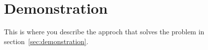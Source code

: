 \section{Demonstration}

This is where you describe the approch that solves the problem in section~\ref{sec:demonstration}.